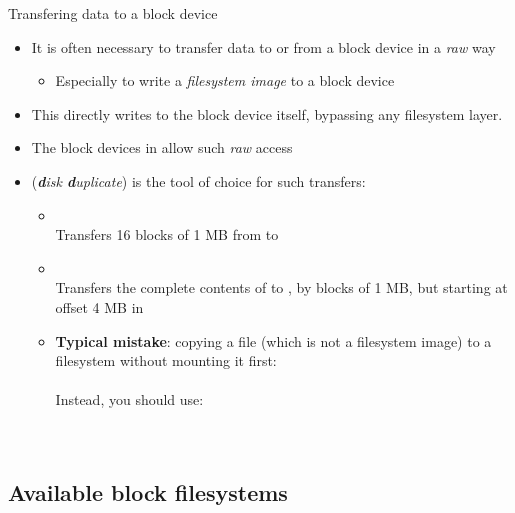 \begin{frame}{Transfering data to a block device}
  \begin{itemize}
  \item It is often necessary to transfer data to or from a block
    device in a {\em raw} way
    \begin{itemize}
    \item Especially to write a {\em filesystem image} to a block
      device
    \end{itemize}
  \item This directly writes to the block device itself, bypassing any
    filesystem layer.
  \item The block devices in  allow such {\em raw} access
  \item {} ({\em {\bf d}isk {\bf d}uplicate})
    is the tool of choice for such transfers:
    \begin{itemize}
    \item {}\\
      Transfers 16 blocks of 1 MB from  to
    \item {}\\
      Transfers the complete contents of  to
      , by blocks of 1 MB, but starting at offset 4 MB
      in 
    \item {\bf Typical mistake}: copying a file (which is not a
          filesystem image) to a filesystem without
          mounting it first:\\
      \\
      Instead, you should use:\\
      \\
      \\
    \end{itemize}
  \end{itemize}
\end{frame}

\subsection{Available block filesystems}

